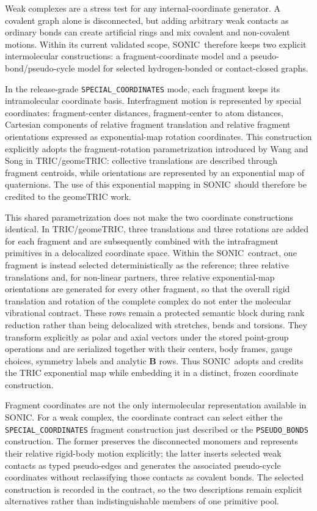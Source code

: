 \documentclass[journal=jctcce,manuscript=article,layout=traditional]{achemso}
\newcommand{\SONIC}{SONIC}
\newcommand{\Bmat}{\mathbf{B}}
\theoremstyle{definition}
\begin{document}
Weak complexes are a stress test for any internal-coordinate generator.  A
covalent graph alone is disconnected, but adding arbitrary weak contacts as
ordinary bonds can create artificial rings and mix covalent and non-covalent
motions.  Within its current validated scope, \SONIC\ therefore keeps two
explicit intermolecular constructions: a fragment-coordinate model
and a pseudo-bond/pseudo-cycle model for selected hydrogen-bonded or
contact-closed graphs.

In the release-grade \texttt{SPECIAL\_COORDINATES} mode, each fragment keeps its
intramolecular coordinate basis.  Interfragment motion is represented by
special coordinates: fragment-center distances, fragment-center to
atom distances, Cartesian components of relative fragment translation and
relative fragment orientations expressed as exponential-map rotation
coordinates.  This construction explicitly adopts the fragment-rotation
parametrization introduced by Wang and Song in TRIC/geomeTRIC: collective
translations are described through fragment centroids, while orientations are
represented by an exponential map of quaternions.\cite{WangSong2016GeomeTRIC}
The use of this exponential mapping in \SONIC\ should therefore be credited to
the geomeTRIC work.

This shared parametrization does not make the two coordinate constructions
identical.  In TRIC/geomeTRIC, three translations and three rotations are added
for each fragment and are subsequently combined with the intrafragment
primitives in a delocalized coordinate space.\cite{WangSong2016GeomeTRIC}
Within the \SONIC\ contract, one fragment is instead selected deterministically
as the reference; three relative translations and, for non-linear partners,
three relative exponential-map orientations are generated for every other
fragment, so that the overall rigid translation and rotation of the complete
complex do not enter the molecular vibrational contract.  These rows remain a
protected semantic block during rank reduction rather than being delocalized
with stretches, bends and torsions.  They transform explicitly as polar and
axial vectors under the stored point-group operations and are serialized
together with their centers, body frames, gauge choices, symmetry labels and
analytic \(\Bmat\) rows.  Thus \SONIC\ adopts and credits the TRIC exponential
map while embedding it in a distinct, frozen coordinate construction.

Fragment coordinates are not the only intermolecular representation available
in \SONIC.  For a weak complex, the coordinate contract can select either the
\texttt{SPECIAL\_COORDINATES} fragment construction just described or the
\texttt{PSEUDO\_BONDS} construction.  The former preserves the disconnected
monomers and represents their relative rigid-body motion explicitly; the latter
inserts selected weak contacts as typed pseudo-edges and generates the
associated pseudo-cycle coordinates without reclassifying those contacts as
covalent bonds.  The selected construction is recorded in the contract, so the
two descriptions remain explicit alternatives rather than indistinguishable
members of one primitive pool.
\end{document}
